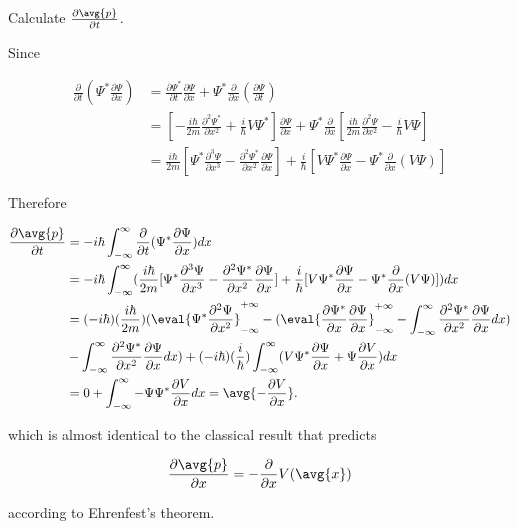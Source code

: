 \documentclass[a4paper,12pt]{report}
\begin{document}
{Calculate \(\frac{\partial \avg{p} }{\partial t} \).}
{Since 
		
\begin{equation}
	\begin{aligned}
		\frac{\partial}{\partial t}\left(\Psi^* \frac{\partial \Psi}{\partial x}\right) & =\frac{\partial \Psi^*}{\partial t} \frac{\partial \Psi}{\partial x}+\Psi^* \frac{\partial}{\partial x}\left(\frac{\partial \Psi}{\partial t}\right) \\
		& =\left[-\frac{i \hbar}{2 m} \frac{\partial^2 \Psi^*}{\partial x^2}+\frac{i}{\hbar} V \Psi^*\right] \frac{\partial \Psi}{\partial x}+\Psi^* \frac{\partial}{\partial x}\left[\frac{i \hbar}{2 m} \frac{\partial^2 \Psi}{\partial x^2}-\frac{i}{\hbar} V \Psi\right] \\
		& =\frac{i \hbar}{2 m}\left[\Psi^* \frac{\partial^3 \Psi}{\partial x^3}-\frac{\partial^2 \Psi^*}{\partial x^2} \frac{\partial \Psi}{\partial x}\right]+\frac{i}{\hbar}\left[V \Psi^* \frac{\partial \Psi}{\partial x}-\Psi^* \frac{\partial}{\partial x}(V \Psi)\right]
	\end{aligned}
\end{equation}
		
Therefore

\begin{equation}
  \begin{aligned}
    \frac{\partial \avg{p} }{\partial t} &= -i\hbar \int_{-\infty}^{\infty} \frac{\partial }{\partial t} (\Psi ^* \frac{\partial \Psi }{\partial x} ) dx \\ &= -i\hbar  \int_{-\infty}^{\infty} (\frac{i\hbar }{2m} [\Psi ^* \frac{\partial ^3 \Psi }{\partial x^3} - \frac{\partial^2 \Psi ^*}{\partial x^2} \frac{\partial \Psi }{\partial x} ]+ \frac{i}{\hbar } [V \Psi ^* \frac{\partial \Psi }{\partial x} - \Psi ^* \frac{\partial }{\partial x} (V\Psi )  ]  )dx \\ &= (-i\hbar ) (\frac{i\hbar }{2m }  )(\eval{\Psi ^* \frac{\partial^2 \Psi }{\partial x^2} }_{-\infty}^{+\infty} - (\eval{\frac{\partial \Psi ^*}{\partial x} \frac{\partial \Psi }{\partial x} }_{-\infty}^{+\infty}-\int_{-\infty}^{\infty} \frac{\partial^2 \Psi ^*}{\partial x^2} \frac{\partial \Psi }{\partial x} dx  ) \\ &-\int_{-\infty}^{\infty} \frac{\partial^2 \Psi ^*}{\partial x^2} \frac{\partial \Psi }{\partial x} dx) +(-i\hbar ) (\frac{i}{\hbar } ) \int_{-\infty}^{\infty} (V\Psi ^* \frac{\partial \Psi }{\partial x} + \Psi \frac{\partial V}{\partial x} )dx \\ & = 0 + \int_{-\infty}^{\infty} -\Psi \Psi ^* \frac{\partial V}{\partial x}dx = \avg{-\frac{\partial V}{\partial x} } .   
  \end{aligned}
\end{equation}
	
which is almost identical to the classical result that predicts 

\begin{equation}
  \frac{\partial \avg{p} }{\partial x} = -\frac{\partial }{\partial x} V(\avg{x} ) 
\end{equation}

according to Ehrenfest's theorem.}
	
\end{document}
